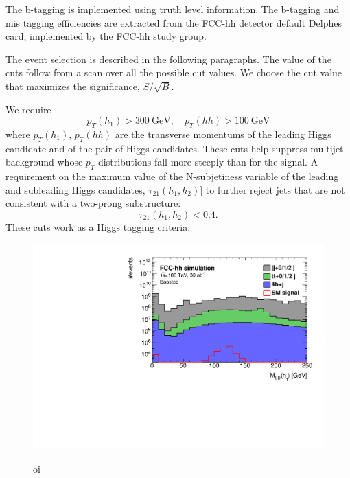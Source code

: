 The b-tagging is implemented using truth level information. The b-tagging and mis tagging efficiencies are extracted from the FCC-hh detector default Delphes card, implemented by the FCC-hh study group.

The event selection is described in the following paragraphs. The value of the cuts follow from a scan over all the possible cut values. We choose the cut value that maximizes the significance, $S/\sqrt{B}$. 

We require
\begin{equation}
	p_T(h_1)>300~\text{GeV}, \quad p_T(hh)>100 ~\text{GeV}
\end{equation}
where $p_T(h_1)$, $p_T(hh)$ are the transverse momentums of the leading Higgs candidate and of the pair of Higgs candidates.
These cuts help suppress multijet background whose $p_T$ distributions fall more steeply than for the signal. A requirement on the maximum value of the N-subjetiness variable of the leading and subleading Higgs candidates, $\tau_{21}(h_1,h_2)]$ to further reject jets that are not consistent with a two-prong substructure:
\begin{equation}
	\tau_{21}(h_1,h_2)<0.4.
\end{equation}
These cuts work as a Higgs tagging criteria.

\begin{figure}[h]
	\centering
	\includegraphics[width=\linewidth]{./images/hist_h1_softdrop_M_stack.pdf}
	\label{fig:stack}
	\caption{oi}
\end{figure}
